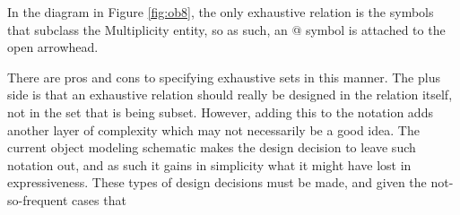 \documentclass[11pt,letterpaper]{article}
\begin{document}
\begin{enumerate}
In the diagram in Figure \ref{fig:ob8}, the only exhaustive relation is the symbols that subclass the Multiplicity entity, so as such, an @ symbol is attached to the open arrowhead.

There are pros and cons to specifying exhaustive sets in this manner. The plus side is that an exhaustive relation should really be designed in the relation itself, not in the set that is being subset. However, adding this to the notation adds another layer of complexity which may not necessarily be a good idea. The current object modeling schematic makes the design decision to leave such notation out, and as such it gains in simplicity what it might have lost in expressiveness. These types of design decisions must be made, and given the not-so-frequent cases that 


\end{enumerate}
\end{document}

